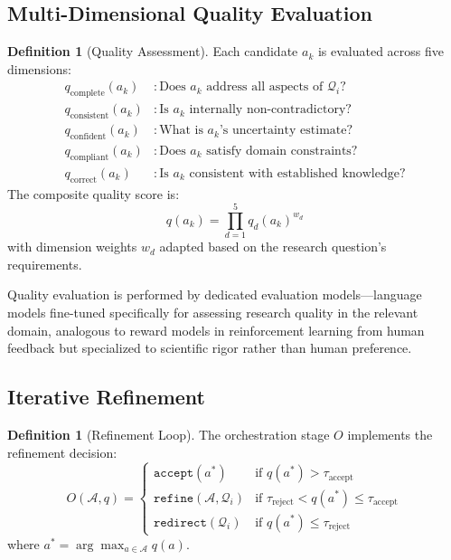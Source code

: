 \documentclass[10pt,twocolumn]{article}
\theoremstyle{definition}
\newtheorem{definition}[theorem]{Definition}
\theoremstyle{remark}
\newcommand{\question}{\mathcal{Q}}
\begin{document}
\subsection{Multi-Dimensional Quality Evaluation}

\begin{definition}[Quality Assessment]
Each candidate $a_k$ is evaluated across five dimensions:
\begin{align}
q_{\text{complete}}(a_k) &: \text{Does } a_k \text{ address all aspects of } \question_i? \\
q_{\text{consistent}}(a_k) &: \text{Is } a_k \text{ internally non-contradictory?} \\
q_{\text{confident}}(a_k) &: \text{What is } a_k\text{'s uncertainty estimate?} \\
q_{\text{compliant}}(a_k) &: \text{Does } a_k \text{ satisfy domain constraints?} \\
q_{\text{correct}}(a_k) &: \text{Is } a_k \text{ consistent with established knowledge?}
\end{align}
The composite quality score is:
\begin{equation}
q(a_k) = \prod_{d=1}^{5} q_d(a_k)^{w_d}
\end{equation}
with dimension weights $w_d$ adapted based on the research question's requirements.
\end{definition}

Quality evaluation is performed by dedicated evaluation models---language models fine-tuned specifically for assessing research quality in the relevant domain, analogous to reward models in reinforcement learning from human feedback but specialized to scientific rigor rather than human preference.



\subsection{Iterative Refinement}

\begin{definition}[Refinement Loop]
The orchestration stage $O$ implements the refinement decision:
\begin{equation}
O(\mathcal{A}, q) = \begin{cases}
\texttt{accept}(a^*) & \text{if } q(a^*) > \tau_{\text{accept}} \\
\texttt{refine}(\mathcal{A}, \question_i) & \text{if } \tau_{\text{reject}} < q(a^*) \leq \tau_{\text{accept}} \\
\texttt{redirect}(\question_i) & \text{if } q(a^*) \leq \tau_{\text{reject}}
\end{cases}
\end{equation}
where $a^* = \arg\max_{a \in \mathcal{A}} q(a)$.
\end{definition}
\end{document}
